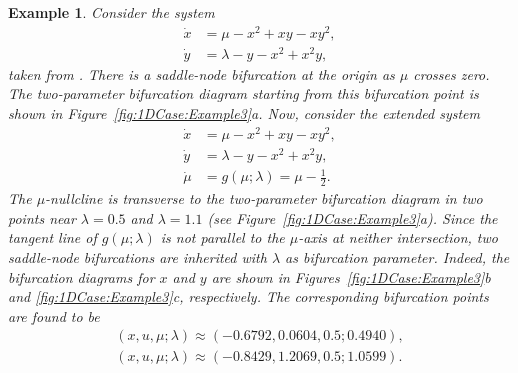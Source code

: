 \documentclass[12pt]{article}
\newtheorem{example}{Example}
\begin{document}
\begin{example}
    \label{exa:NDCase:Example1}
    Consider the system
    \begin{equation*}
        \begin{aligned}
            \dot x &=\mu-x^{2}+xy-xy^{2},\\
            \dot y &=\lambda -y -x^{2}+x^{2}y,
        \end{aligned}
    \end{equation*}
    taken from \citet[p. 292]{Meiss2007}. There is a saddle-node bifurcation at the origin as $\mu$ crosses zero. The two-parameter bifurcation diagram starting from this bifurcation point is shown in Figure~\ref{fig:1DCase:Example3}a. Now, consider the extended system
    \begin{equation*}
        \begin{aligned}
            \dot x &=\mu-x^{2}+xy-xy^{2},\\
            \dot y &=\lambda -y -x^{2}+x^{2}y,\\
            \dot \mu &=g(\mu;\lambda) = \mu - \tfrac{1}{2}.
        \end{aligned}
    \end{equation*}
    The $\mu$-nullcline is transverse to the two-parameter bifurcation diagram in two points near $\lambda=0.5$ and $\lambda=1.1$ (see Figure~\ref{fig:1DCase:Example3}a). Since the tangent line of $g(\mu;\lambda)$ is not parallel to the $\mu$-axis at neither intersection, two saddle-node bifurcations are inherited with $\lambda$ as bifurcation parameter.
    Indeed, the bifurcation diagrams for $x$ and $y$ are shown in Figures~\ref{fig:1DCase:Example3}b and \ref{fig:1DCase:Example3}c, respectively. The corresponding bifurcation points are found to be
    \begin{equation*}
        \begin{aligned}
            (x,u,\mu;\lambda) \approx (-0.6792, 0.0604, 0.5; 0.4940),\\
            (x,u,\mu;\lambda) \approx (-0.8429, 1.2069, 0.5; 1.0599).
        \end{aligned}
    \end{equation*}
\end{example}
\end{document}

